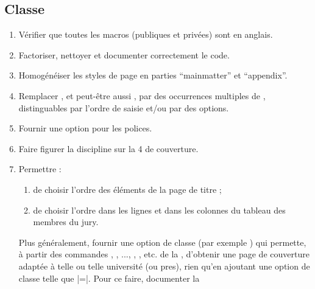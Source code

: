 \subsection{Classe}
\label{sec-classe-ult}

\begin{enumerate}
\item Vérifier que toutes les macros (publiques et privées) sont en anglais.
\item Factoriser, nettoyer et documenter correctement le code.
\item Homogénéiser les styles de page en parties \enquote{mainmatter} et
  \enquote{appendix}.
\item Remplacer , et peut-être aussi , par des
  occurrences multiples de , distinguables par l'ordre de saisie
  et/ou par des  options.
\item Fournir une option pour les polices.
\item Faire figurer la discipline sur la 4\ieme{} de couverture.
\item Permettre :
  \begin{enumerate}
  \item de choisir l'ordre des éléments de la page de titre ;
  \item de choisir l'ordre dans les lignes et dans les colonnes du
    tableau des membres du jury.
  \end{enumerate}
  Plus généralement, fournir une option de classe (par exemple
  ) qui permette, à partir des commandes
  , , ...,
  , , etc. de la \yatCl{},
  d'obtenir une page de couverture adaptée à telle ou telle université (ou
  \gls{pres}), rien qu'en ajoutant une option de classe telle que
  |=|. Pour ce faire, documenter la

\end{enumerate}
